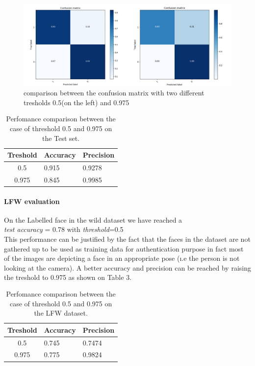 \begin{figure}
\begin{center}

\includegraphics[width=1\linewidth]{images/merged.png}
\end{center}
   \caption{comparison between the confusion matrix with two different tresholds 0.5(on the left) and 0.975}
\label{fig:conf_matrices}
\end{figure}

\begin{table}[]
\centering
\begin{tabular}{|c|ll|}
\hline
Treshold & Accuracy & Precision \\ \hline
0.5                          & 0.915    & 0.9278     \\ \hline
0.975                          & 0.845    & 0.9985     \\ \hline
\end{tabular}
\caption{Perfomance comparison between the case of threshold 0.5 and 0.975 on the Test set.}
\end{table}

\paragraph{LFW evaluation}
On the Labelled face in the wild dataset we have reached a
\\

\textit{test accuracy }= 0.78 with \textit{threshold}=0.5
\\

This performance can be justified by the fact that the faces in the dataset are not gathered up to be used as training data for authentication purpose in fact most of the images are depicting a face in an appropriate pose (\i.e the person is not looking at the camera). A better accuracy and precision can be reached by raising the treshold to 0.975 as shown on Table 3.

\begin{table}[]
\centering
\begin{tabular}{|c|ll|}
\hline
Treshold & Accuracy & Precision \\ \hline
0.5                          & 0.745    & 0.7474     \\ \hline
0.975                          & 0.775    & 0.9824     \\ \hline
\end{tabular}
\caption{Perfomance comparison between the case of threshold 0.5 and 0.975 on the LFW dataset.}
\end{table}

